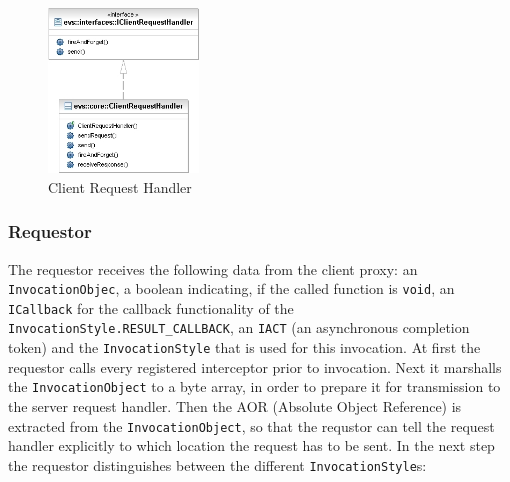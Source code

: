 \begin{figure}[ht!]
	\centering\includegraphics[width=4cm]{uml/ClientRequestHandler.jpg} 
	\caption{Client Request Handler}
	\label{fig:clientrequesthandler}
\end{figure}

\subsubsection{Requestor}
The requestor receives the following data from the client proxy: an \texttt{InvocationObjec}, a boolean indicating, if the called function is \texttt{void}, an \texttt{ICallback} for the callback functionality of the \texttt{InvocationStyle.RESULT\_CALLBACK}, an \texttt{IACT} (an asynchronous completion token) and the \texttt{InvocationStyle} that is used for this invocation. At first the requestor calls every registered interceptor prior to invocation. Next it marshalls the \texttt{InvocationObject} to a byte array, in order to prepare it for transmission to the server request handler. Then the AOR (Absolute Object Reference) is extracted from the \texttt{InvocationObject}, so that the requstor can tell the request handler explicitly to which location the request has to be sent. In the next step the requestor distinguishes between the different \texttt{InvocationStyle}s:

